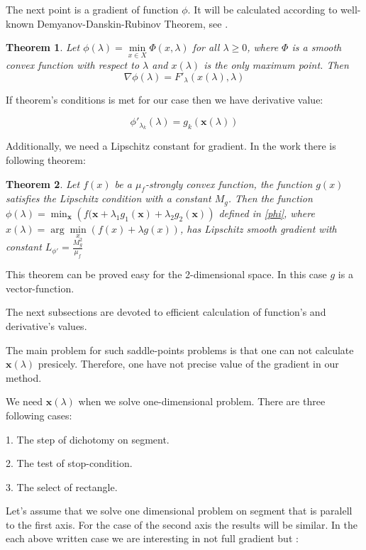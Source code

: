 \documentclass[12pt]{article}
\newtheorem{theorem}{Theorem}[section]
\begin{document}
The next point is a gradient of function $\phi$. It will be calculated according to well-known Demyanov-Danskin-Rubinov Theorem, see \cite{DDR-theorem}.

\begin{theorem}
Let $\phi(\lambda)=\min\limits_{x\in X}\Phi(x,\lambda)$ for all $\lambda\geq0$, where $\Phi$ is a smooth convex function with respect to $\lambda$ and $x(\lambda)$ is the only maximum point. Then
$$\nabla \phi(\lambda) = F'_\lambda\left(x(\lambda),\lambda\right)$$
\end{theorem}

If theorem's conditions is met for our case then we have derivative value:

\begin{equation}
\phi'_{\lambda_k}(\lambda) = g_k\left(\textbf{x}(\lambda)\right)
\end{equation}

Additionally, we need a Lipschitz constant for gradient. In the work \cite{Stonykin} there is following theorem:
\begin{theorem}
Let $f(x)$ be a $\mu_f$-strongly convex function, the function $g(x)$ satisfies the Lipschitz condition with a constant $M_g$. Then the function $\phi(\lambda) = \min_\textbf{x}\left(f(\textbf{x}+\lambda_1g_1(\textbf{x}) + \lambda_2g_2(\textbf{x})\right)$ defined in \ref{phi}, where $x(\lambda) = \arg\min\limits_x(f(x)+\lambda g(x))$, has Lipschitz smooth gradient with constant $L_{\phi'} = \frac{M_g^2}{\mu_f}$
\end{theorem}

This theorem can be proved easy for the 2-dimensional space. In this case $g$ is a vector-function.

The next subsections are devoted to efficient calculation of function's and derivative's values.

The main problem for such saddle-points problems is that one can not calculate $\textbf{x}(\lambda)$ presicely. Therefore, one have not precise value of the gradient in our method.

We need $\textbf{x}(\lambda)$ when we solve one-dimensional problem. There are three following cases:

1. The step of dichotomy on segment.

2. The test of stop-condition.

3. The select of rectangle.

Let's assume that we solve one dimensional problem on segment that is paralell to the first axis. For the case of the second axis the results will be similar. In the each above written case we are interesting in not full gradient but :
\end{document}
